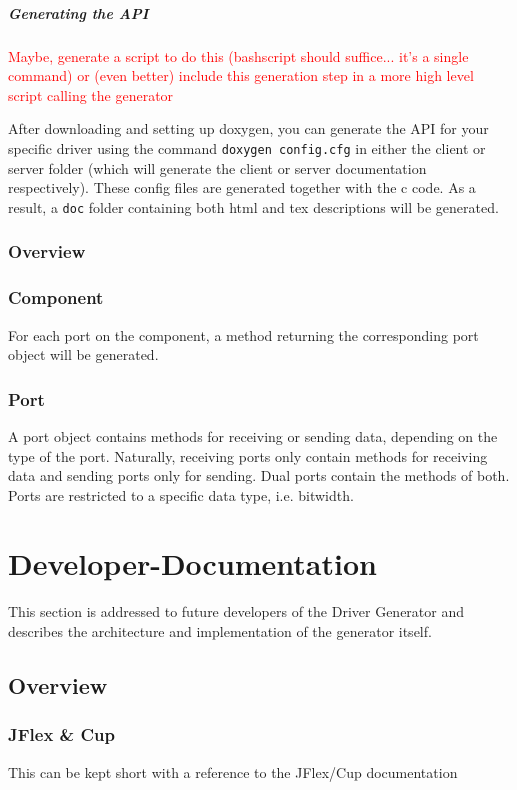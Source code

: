 \documentclass{report}
\begin{document}
\paragraph{Generating the API}
\textcolor{red}{Maybe, generate a script to do this (bashscript should suffice... it's a single command) or (even better) include this generation step in a more high level script calling the generator}

After downloading and setting up doxygen, you can generate the API for your specific driver using the command \texttt{doxygen config.cfg} in either the client or server folder (which will generate the client or server documentation respectively). These config files are generated together with the c code.
As a result, a \texttt{doc} folder containing both html and tex descriptions will be generated.

\subsection{Overview}

\subsection{Component}
For each port on the component, a method returning the corresponding port object will be generated.

\subsection{Port}
A port object contains methods for receiving or sending data, depending on the type of the port. Naturally, receiving ports only contain methods for receiving data and sending ports only for sending. Dual ports contain the methods of both. Ports are restricted to a specific data type, i.e. bitwidth.

\chapter{Developer-Documentation}
\label{sec:devDoc}
This section is addressed to future developers of the Driver Generator and describes the architecture and implementation of the generator itself.

\section{Overview}

\subsection{JFlex \& Cup}
This can be kept short with a reference to the JFlex/Cup documentation
\end{document}
